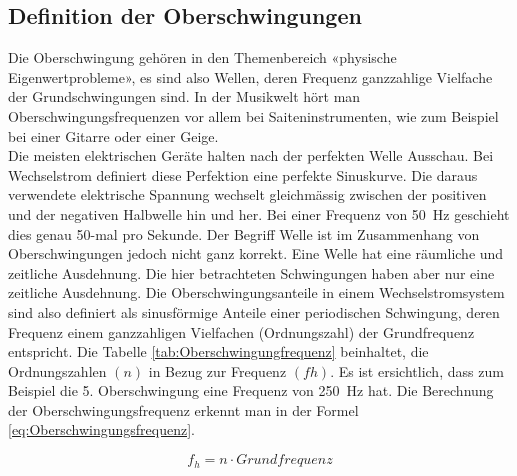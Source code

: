 \subsection{Definition der Oberschwingungen}
Die Oberschwingung gehören in den Themenbereich «physische Eigenwertprobleme», es sind also Wellen, deren Frequenz ganzzahlige Vielfache der Grundschwingungen sind. In der Musikwelt hört man Oberschwingungsfrequenzen vor allem bei Saiteninstrumenten, wie zum Beispiel bei einer Gitarre oder einer Geige.\\
Die meisten elektrischen Geräte halten nach der perfekten Welle Ausschau. Bei Wechselstrom definiert diese Perfektion eine perfekte Sinuskurve. Die daraus verwendete elektrische Spannung wechselt gleichmässig zwischen der positiven und der negativen Halbwelle hin und her. Bei einer Frequenz von \SI{50}{Hz} geschieht dies genau 50-mal pro Sekunde. Der Begriff Welle ist im Zusammenhang von Oberschwingungen jedoch nicht ganz korrekt. Eine Welle hat eine räumliche und zeitliche Ausdehnung. Die hier betrachteten Schwingungen haben aber nur eine zeitliche Ausdehnung. Die Oberschwingungsanteile in einem Wechselstromsystem sind also definiert als sinusförmige Anteile einer periodischen Schwingung, deren Frequenz einem ganzzahligen Vielfachen (Ordnungszahl) der Grundfrequenz entspricht. Die Tabelle \ref{tab:Oberschwingungfrequenz} beinhaltet, die Ordnungszahlen $(n)$ in Bezug zur Frequenz $(fh)$. Es ist ersichtlich, dass zum Beispiel die 5. Oberschwingung eine Frequenz von \SI{250}{Hz} hat. Die Berechnung der Oberschwingungsfrequenz erkennt man in der Formel \ref{eq:Oberschwingungsfrequenz}.


\begin{equation}\label{eq:Oberschwingungsfrequenz}
f_h = n \cdot Grundfrequenz
\end{equation}

